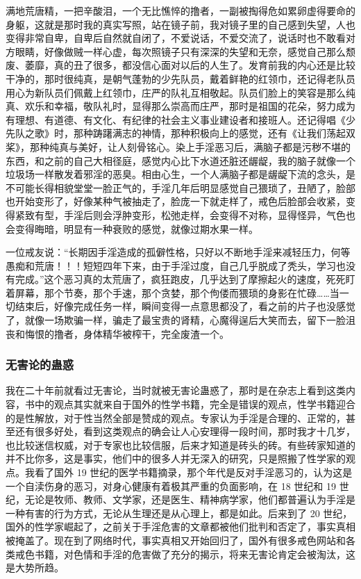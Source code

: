 满地荒唐精，一把辛酸泪，一个无比憔悴的撸者，一副被掏得危如累卵虚得要命的身躯，这就是那时我的真实写照，站在镜子前，我对镜子里的自己感到失望，人也变得非常自卑，自卑后自然就自闭了，不爱说话，不爱交流了，说话时也不敢看对方眼睛，好像做贼一样心虚，每次照镜子只有深深的失望和无奈，感觉自己那么颓废、萎靡，真的丑了很多，都没信心面对以后的人生了。发育前我的内心还是比较干净的，那时很纯真，是朝气蓬勃的少先队员，戴着鲜艳的红领巾，还记得老队员用心为新队员们佩戴上红领巾，庄严的队礼互相敬起。队员们脸上的笑容是那么纯真、欢乐和幸福，敬队礼时，显得那么崇高而庄严，那时是祖国的花朵，努力成为有理想、有道德、有文化、有纪律的社会主义事业建设者和接班人。还记得唱《少先队之歌》时，那种踌躇满志的神情，那种积极向上的感觉，还有《让我们荡起双桨》，那种纯真与美好，让人刻骨铭心。染上手淫恶习后，满脑子都是污秽不堪的东西，和之前的自己大相径庭，感觉内心比下水道还脏还龌龊，我的脑子就像一个垃圾场一样散发着邪淫的恶臭。相由心生，一个人满脑子都是龌龊下流的念头，是不可能长得相貌堂堂一脸正气的，手淫几年后明显感觉自己猥琐了，丑陋了，脸部也开始变形了，好像某种气被抽走了，脸庞一下就走样了，戒色后脸部会收紧，变得紧致有型，手淫后则会浮肿变形，松弛走样，会变得不对称，显得怪异，气色也会变得晦暗，明显有一种衰败的感觉，就像过期水果一样。

一位戒友说：“长期因手淫造成的孤僻性格，只好以不断地手淫来减轻压力，何等愚痴和荒唐！！！短短四年下来，由于手淫过度，自己几乎脱成了秃头，学习也没有完成。”这个恶习真的太荒唐了，疯狂跑皮，几乎达到了摩擦起火的速度，死死盯着屏幕，那个节奏，那个手速，那个贪婪，那个佝偻而猥琐的身影在忙碌……当一切结束后，好像完成任务一样，瞬间变得一点意思都没了，看之前的片子也没感觉了，就像一场欺骗一样，骗走了最宝贵的肾精，心魔得逞后大笑而去，留下一脸沮丧和悔恨的撸者，身体精华被榨干，完全废渣一个。

\subsubsection{无害论的蛊惑}

我在二十年前就看过无害论，当时就被无害论蛊惑了，那时是在杂志上看到这类内容，书中的观点其实就来自于国外的性学书籍，完全是错误的观点，性学书籍迎合的是性解放，对于性当然全部是赞成的观点。专家认为手淫是合理的、正常的，甚至还有很多好处，看到这类观点的确会让人心安理得一段时间，那时我才十几岁，也比较迷信权威，对于专家也比较信服，后来才知道是砖头的砖。有些砖家知道的并不比你多，这是事实，他们中的很多人并无深入的研究，只是照搬了性学家的观点。我看了国外 19 世纪的医学书籍摘录，那个年代是反对手淫恶习的，认为这是一个自渎伤身的恶习，对身心健康有着极其严重的负面影响，在 18 世纪和 19 世纪，无论是牧师、教师、文学家，还是医生、精神病学家，他们都普遍认为手淫是一种有害的行为方式，无论从生理还是从心理上，都是如此。后来到了 20 世纪，国外的性学家崛起了，之前关于手淫危害的文章都被他们批判和否定了，事实真相被掩盖了。现在到了网络时代，事实真相又开始回归了，国外有很多戒色网站和各类戒色书籍，对色情和手淫的危害做了充分的揭示，将来无害论肯定会被淘汰，这是大势所趋。


